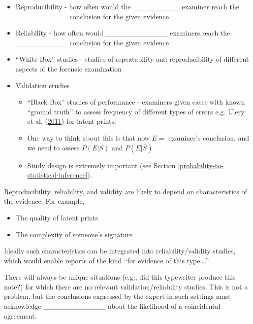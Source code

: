 \documentclass[]{book}
\providecommand{\tightlist}{%
  \setlength{\itemsep}{0pt}\setlength{\parskip}{0pt}}
\theoremstyle{definition}
\theoremstyle{definition}
\theoremstyle{remark}
\begin{document}
\begin{itemize}
\tightlist
\item
  Reproducibility - how often would the \_\_\_\_\_\_\_\_\_ examiner
  reach the \_\_\_\_\_\_\_\_\_\_ conclusion for the given evidence
  \vspace{.1in}
\item
  Reliability - how often would \_\_\_\_\_\_\_\_\_\_\_\_ examiners reach
  the \_\_\_\_\_\_\_\_\_\_ conclusion for the given evidence
  \vspace{.1in}
\item
  ``White Box'' studies - studies of repeatability and reproducibility
  of different aspects of the forensic examination
\item
  Validation studies

  \begin{itemize}
  \tightlist
  \item
    ``Black Box'' studies of performance - examiners given cases with
    known ``ground truth'' to assess frequency of different types of
    errors e.g. Ulery et al. (\protect\hyperlink{ref-uleryetal}{2011})
    for latent prints.
  \item
    One way to think about this is that now \(E=\) examiner's
    conclusion, and we need to assess \(P(E|S)\) and
    \(P(E|\overline{S})\)
  \item
    Study design is extremely important (see Section
    \ref{probability-to-statistical-inference}).
  \end{itemize}
\end{itemize}

Reproducibility, reliability, and validity are likely to depend on
characteristics of the evidence. For example,

\begin{itemize}
\tightlist
\item
  The quality of latent prints
\item
  The complexity of someone's signature
\end{itemize}

Ideally such characteristics can be integrated into reliability/validity
studies, which would enable reports of the kind ``for evidence of this
type\ldots{}.''

There will always be unique situations (e.g., did this typewriter
produce this note?) for which there are no relevant
validation/reliability studies. This is not a problem, but the
conclusions expressed by the expert in such settings must acknowledge
\_\_\_\_\_\_\_\_\_\_\_\_ about the likelihood of a coincidental
agreement.
\end{document}
